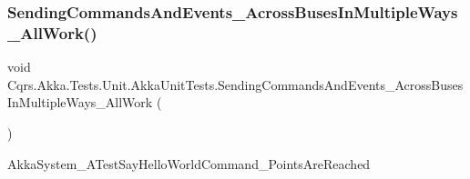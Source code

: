 \subsubsection{\texorpdfstring{Sending\+Commands\+And\+Events\+\_\+\+Across\+Buses\+In\+Multiple\+Ways\+\_\+\+All\+Work()}{SendingCommandsAndEvents\_AcrossBusesInMultipleWays\_AllWork()}}
{\footnotesize\ttfamily void Cqrs.\+Akka.\+Tests.\+Unit.\+Akka\+Unit\+Tests.\+Sending\+Commands\+And\+Events\+\_\+\+Across\+Buses\+In\+Multiple\+Ways\+\_\+\+All\+Work (\begin{DoxyParamCaption}{ }\end{DoxyParamCaption})}



Akka\+System\+\_\+\+A\+Test\+Say\+Hello\+World\+Command\+\_\+Points\+Are\+Reached 

